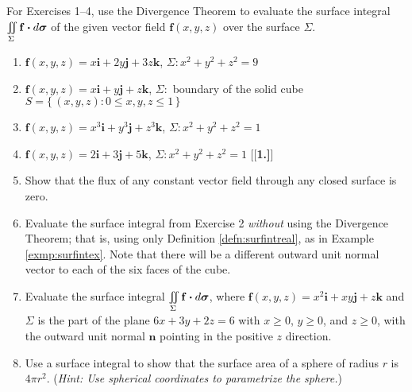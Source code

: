 \startexercises\label{sec4dot4}
\par\noindent For Exercises 1--4, use the Divergence Theorem to evaluate the surface integral
$\iint\limits_{\Sigma} \mathbf{f} \bm{\cdot} d\bm{\sigma}$ of the given vector field $\mathbf{f}(x,y,z)$ over the
surface $\Sigma$.
\begin{enumerate}[\bfseries 1.]
 \item $\mathbf{f}(x,y,z) = x\mathbf{i} + 2y\mathbf{j} + 3z\mathbf{k}$, $\Sigma: x^2 + y^2 + z^2 = 9$
 \item $\mathbf{f}(x,y,z) = x\mathbf{i} + y\mathbf{j} + z\mathbf{k}$, $\Sigma:$ boundary of the solid cube
  $S = \lbrace\, (x,y,z): 0 \le x,y,z \le 1 \,\rbrace$
 \item $\mathbf{f}(x,y,z) = x^3\mathbf{i} + y^3\mathbf{j} + z^3\mathbf{k}$, $\Sigma: x^2 + y^2 + z^2 = 1$
 \item $\mathbf{f}(x,y,z) = 2\mathbf{i} + 3\mathbf{j} + 5\mathbf{k}$, $\Sigma: x^2 + y^2 + z^2 = 1$
[{[\bfseries 1.]}]

\item Show that the flux of any constant vector field through any closed surface is zero.

\item Evaluate the surface integral from Exercise 2 \emph{without} using the Divergence Theorem;
that is, using only Definition \ref{defn:surfintreal}, as in Example \ref{exmp:surfintex}. 
Note that there will be a different outward unit normal vector to each of the six faces of the cube.

\item Evaluate the surface integral $\iint\limits_{\Sigma} \mathbf{f} \bm{\cdot} d\bm{\sigma}$, where
  $\mathbf{f}(x,y,z) = x^2 \mathbf{i} + xy\mathbf{j} + z\mathbf{k}$ and $\Sigma$ is the part of the plane $6x+3y+2z=6$
  with $x \ge 0$, $y \ge 0$, and $z \ge 0$, with the outward unit normal $\mathbf{n}$ pointing in the positive $z$
  direction.

\item Use a surface integral to show that the surface area of a sphere of radius $r$ is $4\pi r^2$. 
(\emph{Hint: Use spherical coordinates to parametrize the sphere.})


\end{enumerate}
